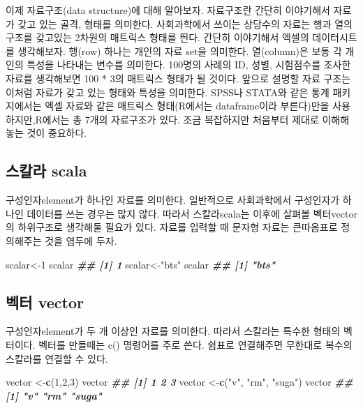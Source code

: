 \documentclass[
]{book}
\newenvironment{Shaded}{\begin{snugshade}}{\end{snugshade}}
\newcommand{\DecValTok}[1]{\textcolor[rgb]{0.00,0.00,0.81}{#1}}
\newcommand{\DocumentationTok}[1]{\textcolor[rgb]{0.56,0.35,0.01}{\textbf{\textit{#1}}}}
\newcommand{\FunctionTok}[1]{\textcolor[rgb]{0.13,0.29,0.53}{\textbf{#1}}}
\newcommand{\NormalTok}[1]{#1}
\newcommand{\OtherTok}[1]{\textcolor[rgb]{0.56,0.35,0.01}{#1}}
\newcommand{\StringTok}[1]{\textcolor[rgb]{0.31,0.60,0.02}{#1}}
\begin{document}
이제 자료구조(data structure)에 대해 알아보자. 자료구조란 간단히 이야기해서 자료가 갖고 있는 골격, 형태를 의미한다. 사회과학에서 쓰이는 상당수의 자료는 행과 열의 구조를 갖고있는 2차원의 매트릭스 형태를 띈다. 간단히 이야기해서 엑셀의 데이터시트를 생각해보자. 행(row) 하나는 개인의 자료 set을 의미한다. 열(column)은 보통 각 개인의 특성을 나타내는 변수를 의미한다. 100명의 사례의 ID, 성별, 시험점수를 조사한 자료를 생각해보면 100 * 3의 매트릭스 형태가 될 것이다.
앞으로 설명할 자료 구조는 이처럼 자료가 갖고 있는 형태와 특성을 의미한다. SPSS나 STATA와 같은 통계 패키지에서는 엑셀 자료와 같은 매트릭스 형태(R에서는 dataframe이라 부른다)만을 사용하지만,R에서는 총 7개의 자료구조가 있다. 조금 복잡하지만 처음부터 제대로 이해해놓는 것이 중요하다.

\subsection{스칼라 scala}\label{uxc2a4uxce7cuxb77c-scala}

구성인자element가 하나인 자료를 의미한다. 일반적으로 사회과학에서 구성인자가 하나인 데이터를 쓰는 경우는 많지 않다. 따라서 스칼라scala는 이후에 살펴볼 벡터vector의 하위구조로 생각해둘 필요가 있다. 자료를 입력할 때 문자형 자료는 큰따옴표로 정의해주는 것을 염두에 두자.

\begin{Shaded}
\begin{Highlighting}[]
\NormalTok{scalar}\OtherTok{\textless{}{-}}\DecValTok{1}
\NormalTok{scalar}
\DocumentationTok{\#\# [1] 1}
\NormalTok{scalar}\OtherTok{\textless{}{-}}\StringTok{"bts"}
\NormalTok{scalar}
\DocumentationTok{\#\# [1] "bts"}
\end{Highlighting}
\end{Shaded}

\subsection{벡터 vector}\label{uxbca1uxd130-vector}

구성인자element가 두 개 이상인 자료를 의미한다. 따라서 스칼라는 특수한 형태의 벡터이다. 벡터를 만들때는 c() 명령어를 주로 쓴다. 쉼표로 연결해주면 무한대로 복수의 스칼라를 연결할 수 있다.

\begin{Shaded}
\begin{Highlighting}[]
\NormalTok{vector }\OtherTok{\textless{}{-}}\FunctionTok{c}\NormalTok{(}\DecValTok{1}\NormalTok{,}\DecValTok{2}\NormalTok{,}\DecValTok{3}\NormalTok{)}
\NormalTok{vector}
\DocumentationTok{\#\# [1] 1 2 3}
\NormalTok{vector }\OtherTok{\textless{}{-}}\FunctionTok{c}\NormalTok{(}\StringTok{"v"}\NormalTok{, }\StringTok{"rm"}\NormalTok{, }\StringTok{"suga"}\NormalTok{)}
\NormalTok{vector}
\DocumentationTok{\#\# [1] "v"    "rm"   "suga"}
\end{Highlighting}
\end{Shaded}
\end{document}
